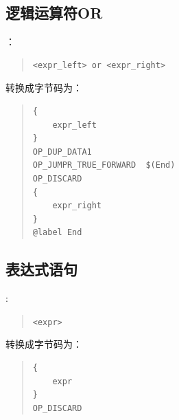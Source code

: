 \subsection{逻辑运算符OR}
：
\begin{quote}
\begin{verbatim}
<expr_left> or <expr_right>
\end{verbatim}
\end{quote}
转换成字节码为：
\begin{quote}
\begin{verbatim}
{
    expr_left
}
OP_DUP_DATA1
OP_JUMPR_TRUE_FORWARD  $(End)
OP_DISCARD
{
    expr_right
}
@label End
\end{verbatim}
\end{quote}

\subsection{表达式语句}
:
\begin{quote}
\verb|<expr>|
\end{quote}
转换成字节码为：
\begin{quote}
\begin{verbatim}
{
    expr
}
OP_DISCARD
\end{verbatim}
\end{quote}

